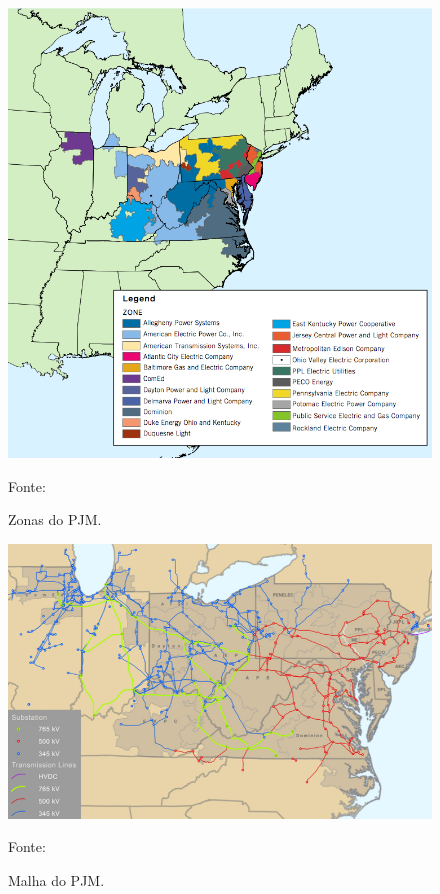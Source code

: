 \begin{figure}[htb]
	\caption{Zonas do PJM.}
	\begin{center}
	    \includegraphics[scale=.5]{figuras/Zonas_PJM.png}
	\end{center}
   \begin{center}
      \footnotesize {Fonte: \cite{Zonas}}
   \end{center}
    \label{fig:Zonas}
\end{figure}

\begin{figure}[htb]
	\caption{Malha do PJM.}
	\begin{center}
	    \includegraphics[scale=.5]{figuras/Malha_PJM.png}
	\end{center}
   \begin{center}
      \footnotesize {Fonte: \cite{Malha}}
   \end{center}
    \label{fig:Malha}
\end{figure} 

